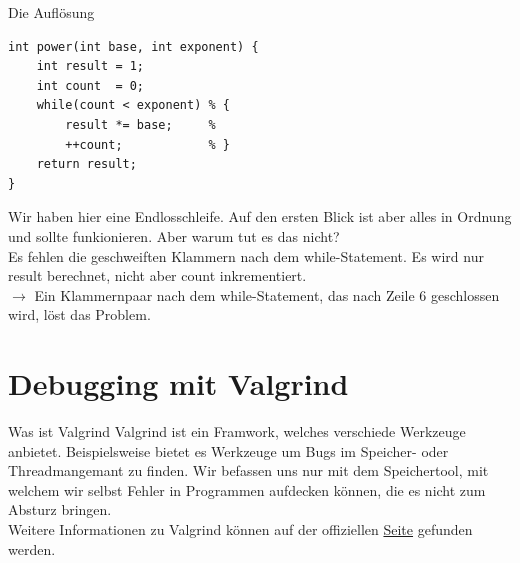 \begin{frame}[fragile]{Die Auflösung}
\begin{lstlisting}
int power(int base, int exponent) {
	int result = 1;
	int count  = 0;
	while(count < exponent) % {
		result *= base;     %  
		++count;            % }
	return result;
}\end{lstlisting}

Wir haben hier eine Endlosschleife. Auf den ersten Blick ist aber alles in Ordnung und sollte funkionieren. Aber warum tut es das nicht? \\
\bigskip
Es fehlen die geschweiften Klammern nach dem while-Statement. Es wird nur result berechnet, nicht aber count inkrementiert.\\
$\rightarrow$  Ein Klammernpaar nach dem while-Statement, das nach Zeile 6 geschlossen wird, löst das Problem.
\end{frame}

\section{Debugging mit Valgrind}
\begin{frame}{Was ist Valgrind}
Valgrind ist ein Framwork, welches verschiede Werkzeuge anbietet. Beispielsweise bietet es Werkzeuge um Bugs im Speicher- oder Threadmangemant zu finden. Wir befassen uns nur mit dem Speichertool, mit welchem wir selbst Fehler in Programmen aufdecken k\"onnen, die es nicht zum Absturz bringen.\\
\bigskip
Weitere Informationen zu Valgrind können auf der offiziellen \href{http://valgrind.org/}{Seite} gefunden werden. 
\end{frame}

